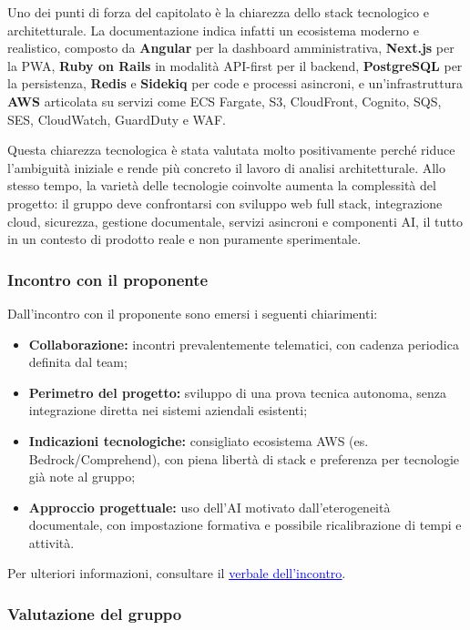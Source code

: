 \documentclass[a4paper,12pt]{article}
\begin{document}
Uno dei punti di forza del capitolato è la chiarezza dello stack tecnologico e architetturale. La documentazione indica infatti un ecosistema moderno e realistico, composto da \textbf{Angular} per la dashboard amministrativa, \textbf{Next.js} per la PWA, \textbf{Ruby on Rails} in modalità API-first per il backend, \textbf{PostgreSQL} per la persistenza, \textbf{Redis} e \textbf{Sidekiq} per code e processi asincroni, e un'infrastruttura \textbf{AWS} articolata su servizi come ECS Fargate, S3, CloudFront, Cognito, SQS, SES, CloudWatch, GuardDuty e WAF.

Questa chiarezza tecnologica è stata valutata molto positivamente perché riduce l'ambiguità iniziale e rende più concreto il lavoro di analisi architetturale. Allo stesso tempo, la varietà delle tecnologie coinvolte aumenta la complessità del progetto: il gruppo deve confrontarsi con sviluppo web full stack, integrazione cloud, sicurezza, gestione documentale, servizi asincroni e componenti AI, il tutto in un contesto di prodotto reale e non puramente sperimentale.

\subsubsection{Incontro con il proponente}

Dall'incontro con il proponente sono emersi i seguenti chiarimenti:
\begin{itemize}
    \item \textbf{Collaborazione:} incontri prevalentemente telematici, con cadenza periodica definita dal team;
    \item \textbf{Perimetro del progetto:} sviluppo di una prova tecnica autonoma, senza integrazione diretta nei sistemi aziendali esistenti;
    \item \textbf{Indicazioni tecnologiche:} consigliato ecosistema AWS (es. Bedrock/Comprehend), con piena libertà di stack e preferenza per tecnologie già note al gruppo;
    \item \textbf{Approccio progettuale:} uso dell'AI motivato dall'eterogeneità documentale, con impostazione formativa e possibile ricalibrazione di tempi e attività.
\end{itemize}

Per ulteriori informazioni, consultare il \href{https://alittlebyte-19.github.io/Documentazione/candidatura/verbali/Verbali%20Esterni/Verbale_Esterno_2026-03-16.pdf}{\textcolor{blue}{\underline{verbale dell'incontro}}}.

\subsubsection{Valutazione del gruppo}
\end{document}
